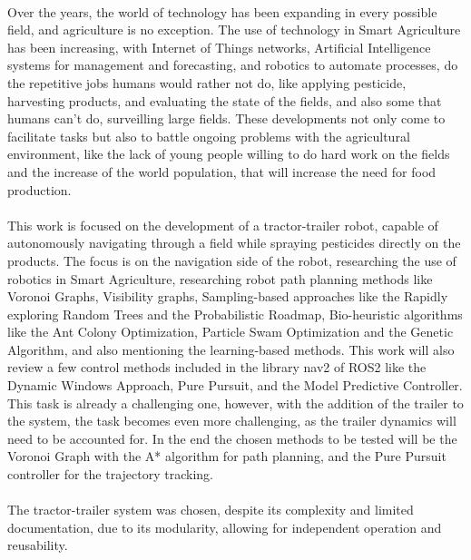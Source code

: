 
%

\paragraph{}Over the years, the world of technology has been expanding in every possible field, 
and agriculture is no exception. The use of technology in Smart Agriculture has been increasing, with 
Internet of Things networks, Artificial Intelligence systems for management and forecasting, and robotics to 
automate processes, do the repetitive jobs humans would rather not do, like applying pesticide, 
harvesting products, and evaluating the state of the fields, and also some that humans can't do, 
surveilling large fields. These developments not only come to facilitate tasks but also to battle ongoing problems 
with the agricultural environment, like the lack of young people willing to do hard work on the fields 
and the increase of the world population, that will increase the need for food production. 

\paragraph{}This work is focused on the development of 
a tractor-trailer robot, capable of autonomously navigating through a field while spraying pesticides 
directly on the products. The focus is on the navigation side of the robot, researching the use of 
robotics in Smart Agriculture, researching robot path planning methods like Voronoi Graphs, Visibility graphs, Sampling-based approaches like 
the Rapidly exploring Random Trees and the Probabilistic Roadmap, 
Bio-heuristic algorithms like the Ant Colony Optimization, Particle Swam Optimization and the Genetic Algorithm, and also mentioning the learning-based methods. 
This work will also review a few control methods included in the library nav2 of ROS2 like the Dynamic Windows Approach,
 Pure Pursuit, and the Model Predictive Controller. This task is already a challenging one, however, with the addition of the trailer 
 to the system, the task becomes even more challenging, as the trailer dynamics will need to be accounted 
for. In the end the chosen methods to be tested will be the Voronoi Graph with the A* algorithm for path 
planning, and the Pure Pursuit controller for the trajectory tracking.


\paragraph{}The tractor-trailer system was chosen, despite its complexity and limited documentation, 
due to its modularity, allowing for independent operation and reusability.

